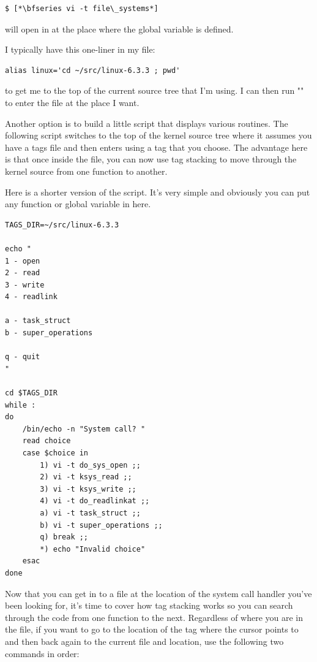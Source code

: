 \begin{lstlisting}
$ [*\bfseries vi -t file\_systems*]
\end{lstlisting}

\noindent
will open  in  at the place where the  global variable is defined.

I typically have this one-liner in my  file:

\begin{lstlisting}
alias linux='cd ~/src/linux-6.3.3 ; pwd'
\end{lstlisting}

\noindent
to get me to the top of the current source tree that I'm using. I can then run "" to enter the file at the place I want.

Another option is to build a little script that displays various routines. The following script switches to the top of the kernel source tree where it assumes you have a tags file and then enters  using a tag that you choose. The advantage here is that once inside the file, you can now use tag stacking to move through the kernel source from one function to another. 

Here is a shorter version of the  script. It's very simple and obviously you can put any function or global variable in here.

\begin{lstlisting}
TAGS_DIR=~/src/linux-6.3.3

echo "
1 - open
2 - read
3 - write
4 - readlink

a - task_struct
b - super_operations

q - quit
"

cd $TAGS_DIR
while :
do
    /bin/echo -n "System call? "
    read choice
    case $choice in
        1) vi -t do_sys_open ;;
        2) vi -t ksys_read ;;
        3) vi -t ksys_write ;;
        4) vi -t do_readlinkat ;;
        a) vi -t task_struct ;;
        b) vi -t super_operations ;;
        q) break ;;
        *) echo "Invalid choice"
    esac
done
\end{lstlisting}

\noindent
Now that you can get in to a file at the location of the system call handler you've been looking for, it's time to cover how tag stacking works so you can search through the code from one function to the next. Regardless of where you are in the file, if you want to go to the location of the tag where the cursor points to and then back again to the current file and location, use the following two commands in order:

